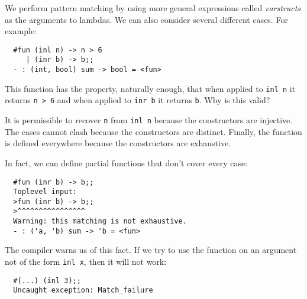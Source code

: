 \begin{slide*}


\vspace*{0.5cm}

We perform pattern matching by using more general expressions called {\em
varstructs} as the arguments to lambdas. We can also consider several different
cases. For example:

\begin{black}\begin{verbatim}
  #fun (inl n) -> n > 6
     | (inr b) -> b;;
  - : (int, bool) sum -> bool = <fun>
\end{verbatim}\end{black}

This function has the property, naturally enough, that when applied to {\black
\tt inl n} it returns {\black \verb+n > 6+} and when applied to {\black \tt inr
b} it returns {\black \tt b}. Why is this valid?

It is permissible to recover {\black \tt n} from {\black \tt inl n} because the
constructors are injective. The cases cannot clash because the constructors are
distinct. Finally, the function is defined everywhere because the constructors
are exhaustive.

\end{slide*}




\begin{slide*}


\vspace*{0.5cm}

In fact, we can define partial functions that don't cover every case:

\begin{black}\begin{verbatim}
  #fun (inr b) -> b;;
  Toplevel input:
  >fun (inr b) -> b;;
  >^^^^^^^^^^^^^^^^
  Warning: this matching is not exhaustive.
  - : ('a, 'b) sum -> 'b = <fun>
\end{verbatim}\end{black}

The compiler warns us of this fact. If we try to use the function on an
argument not of the form {\black \tt inl x}, then it will not work:

\begin{black}\begin{verbatim}
  #(...) (inl 3);;
  Uncaught exception: Match_failure
\end{verbatim}\end{black}

\end{slide*}





